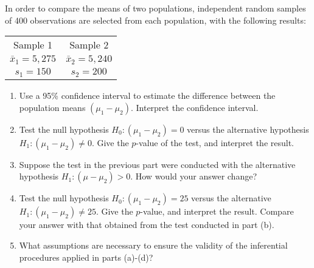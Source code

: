 
\begin{exercise}

In order to compare the means of two populations, independent random samples
of 400 observations are selected from each population, with the following results:

\begin{center}
    \begin{tabular}{c c}
        Sample 1 & Sample 2 \\
        $\bar{x}_1 = 5,275$ & $\bar{x}_2 = 5,240$ \\
        $s_1 = 150$ & $s_2 = 200$ \\
    \end{tabular}
\end{center}

\begin{enumerate}[label = (\alph*)]
    \item Use a 95\% confidence interval to estimate the difference between
    the population means $(\mu_1 - \mu_2)$. Interpret the confidence interval.
    \item Test the null hypothesis $H_0: (\mu_1 - \mu_2) = 0$ versus the
    alternative hypothesis $H_1: (\mu_1 - \mu_2) \neq 0$. Give the $p$-value of the test, and interpret the result.
    \item Suppose the test in the previous part were conducted with the alternative hypothesis 
    $H_1: (\mu - \mu_2) > 0$. How would your answer change?
    \item Test the null hypothesis $H_0: (\mu_1 - \mu_2) = 25$ versus the alternative $H_1: (\mu_1 - \mu_2) \neq 25$.
    Give the $p$-value, and interpret the result. Compare your answer with that
    obtained from the test conducted in part (b).
    \item What assumptions are necessary to ensure the validity of the inferential procedures applied in parts (a)-(d)?
\end{enumerate}

\end{exercise}


